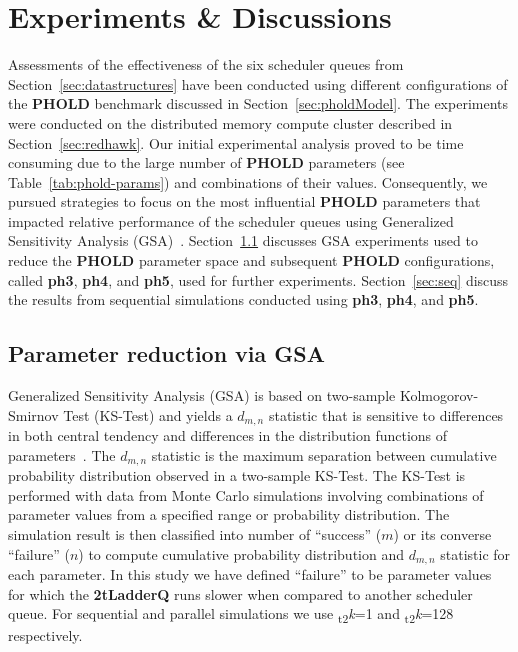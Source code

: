 \chapter{Experiments \& Discussions}\label{sec:experiments}

Assessments of the effectiveness of the six scheduler queues from Section~\ref{sec:datastructures} have been conducted using different configurations of the \textbf{PHOLD} benchmark discussed in Section~\ref{sec:pholdModel}. The experiments were conducted on the distributed memory compute cluster described in Section~\ref{sec:redhawk}. Our initial experimental analysis proved to be time consuming due to the large number of \textbf{PHOLD} parameters (see Table~\ref{tab:phold-params}) and combinations of their values. Consequently, we pursued strategies to focus on the most influential \textbf{PHOLD} parameters that impacted relative performance of the scheduler queues using Generalized Sensitivity Analysis (GSA)~\cite{guven-07}. Section~\ref{sec:gsa} discusses GSA experiments used to reduce the \textbf{PHOLD} parameter space and subsequent \textbf{PHOLD} configurations, called \textbf{ph3}, \textbf{ph4}, and \textbf{ph5}, used for further experiments.  Section~\ref{sec:seq} discuss the results from sequential simulations conducted using \textbf{ph3}, \textbf{ph4}, and \textbf{ph5}.

\section{Parameter reduction via GSA}\label{sec:gsa}

Generalized Sensitivity Analysis (GSA) is based on two-sample Kolmogorov-Smirnov Test (KS-Test) and yields a $d_{m,n}$ statistic
that is sensitive to differences in both central tendency and differences in the distribution functions of
parameters~\cite{guven-07}. The $d_{m,n}$ statistic is the maximum separation between cumulative probability distribution observed in a
two-sample KS-Test. The KS-Test is performed with data from Monte Carlo simulations involving combinations of parameter values from a
specified range or probability distribution. The simulation result is then classified into number of ``success'' ($m$) or its converse
``failure'' ($n$) to compute cumulative probability distribution and $d_{m,n}$ statistic for each parameter. In this study we have defined
``failure'' to be parameter values for which the \textbf{2tLadderQ} runs slower when compared to another scheduler queue. For sequential and parallel simulations we use \textsubscript{t2}\textit{k}=1 and \textsubscript{t2}\textit{k}=128 respectively.

